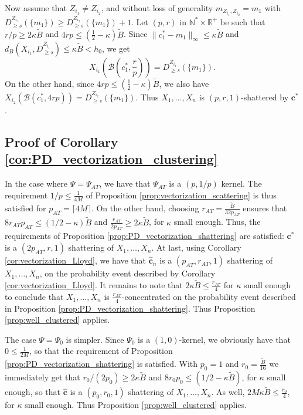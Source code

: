 \documentclass[noinfoline,preprint]{article}
\newcommand{\cb}{\mathbf{c}}
\newcommand{\R}{\mathbb{R}}
\renewcommand{\1}{\mathds 1}
\newcommand{\B}{\mathcal{B}}
\begin{document}
Now assume that $Z_{i_1} \neq Z_{i_2}$, and without loss of generality $m_{Z_{i_1},Z_{i_2}} = m_1$ with $D^{Z_{i_1}}_{\geq s}(\{m_1\}) \geq D^{Z_{i_2}}_{\geq s}(\{m_1\})+1$. Let $(p,r)$ in $\mathbb{N}^* \times \R^+$ be such that $r/p \geq 2 \kappa \tilde{B}$ and $4rp \leq \left( \frac{1}{2} - \kappa \right ) \tilde{B}$. Since $\|c^*_1 - m_1\|_\infty \leq \kappa \tilde{B}$ and $d_B(X_{i_1},D^{Z_{i_1}}_{\geq s}) \leq \kappa \tilde{B} < h_0$, we get 
\[
X_{i_1}\left ( \B(c_1^*,\frac{r}{p}) \right ) = D^{Z_{i_1}}_{\geq s}(\{m_1\}).
\]
On the other hand, since $4rp \leq (\frac{1}{2}-\kappa) \tilde{B}$, we also have $X_{i_2}\left ( \B(c_1^*,4rp) \right ) = D^{Z_{i_2}}_{\geq s}(\{m_1\})$.
Thus $X_1, \hdots, X_n$ is $(p,r,1)$-shattered by $\cb^*$.
\subsection{Proof of Corollary \ref{cor:PD_vectorization_clustering}}\label{sec:proof_cor_PD_vectorization_clustering}
In the case where $\Psi = \Psi_{AT}$, we have that $\Psi_{AT}$ is a $(p,1/p)$ kernel. The requirement $1/p \leq \frac{1}{4M}$ of Proposition \ref{prop:vectorization_scattering} is thus satisfied for $p_{AT} = \lceil 4M \rceil$. On the other hand, choosing $r_{AT} = \frac{\tilde{B}}{32 p_{AT}}$ ensures that $8 r_{AT}p_{AT} \leq (1/2 - \kappa) \tilde{B}$ and $\frac{r_{AT}}{2p_{AT}} \geq 2 \kappa \tilde{B}$, for $\kappa$ small enough. Thus, the requirements of Proposition \ref{prop:PD_vectorization_shattering} are satisfied: $\cb^*$ is a $(2p_{AT},r,1)$ shattering of $X_1, \hdots, X_n$. At last, using Corollary \ref{cor:vectorization_Lloyd}, we have that $\hat{\cb}_n$ is a $(p_{AT},r_{AT},1)$ shattering of $X_1, \hdots, X_n$, on the probability event described by Corollary \ref{cor:vectorization_Lloyd}. It remains to note that $2 \kappa \tilde{B} \leq \frac{r_{AT}}{4}$ for $\kappa$ small enough to conclude that $X_1, \hdots, X_n$ is $\frac{r_{AT}}{4}$-concentrated on the probability event described in Proposition \ref{prop:PD_vectorization_shattering}. Thus Proposition \ref{prop:well_clustered} applies.

The case $\Psi = \Psi_0$ is simpler. Since $\Psi_0$ is a $(1,0)$-kernel, we obviously have that $0 \leq \frac{1}{2M}$, so that the requirement of Proposition \ref{prop:PD_vectorization_shattering} is satisfied. With $p_0 =1$ and $r_0 = \frac{\tilde{B}}{16}$ we immediately get that $r_0/(2p_0) \geq 2 \kappa \tilde{B}$ and $8r_0p_0 \leq (1/2 - \kappa \tilde{B})$, for $\kappa$ small enough, so that $\hat{\cb}$ is a $(p_0,r_0,1)$ shattering of $X_1, \hdots, X_n$. As well, $2M \kappa \tilde{B} \leq \frac{r_0}{4}$, for $\kappa$ small enough. Thus Proposition \ref{prop:well_clustered} applies. 
\end{document}
